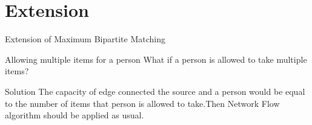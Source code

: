 \documentclass{beamer}
\begin{document}
\section{Extension}
\begin{frame}{Extension of Maximum Bipartite Matching}
    \begin{block}{Allowing multiple items for a person}
    What if a person is allowed to take multiple items?
\end{block}
\pause
    \begin{block}{Solution}
        The capacity of edge connected the source and a person would be equal to the number of items that person is allowed to take.Then Network Flow algorithm should be applied as usual.
    \end{block}
\end{frame}
\end{document}
